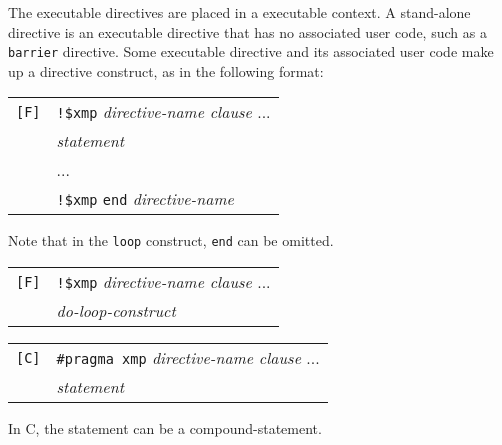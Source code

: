 The executable directives are placed in a executable context. A
stand-alone directive is an executable directive that has no associated
user code, such as a {\tt barrier} directive.
%
Some executable directive and its associated user code make up a
directive construct, as in the following format:

\vspace{0.5cm}

\begin{tabular}{ll}
\verb![F]! & \verb|!$xmp| {\it directive-name clause} ...\\
 & \hspace{0.5cm} {\it statement} \\
 & \hspace{0.5cm} ... \\
 & \verb|!$xmp| {\tt end} {\it directive-name} \\
\end{tabular}
\vspace{0.3cm}

Note that in the {\tt loop} construct, {\tt end} can be omitted.

\vspace{0.5cm}

\begin{tabular}{ll}
\verb![F]! & \verb|!$xmp| {\it directive-name clause} ...\\
 & \hspace{0.5cm} {\it do-loop-construct} \\
\end{tabular}

\vspace{0.5cm}

\begin{tabular}{ll}
\verb![C]! & \verb|#pragma xmp| {\it directive-name clause} ...\\
 & \hspace{0.5cm} {\it statement} \\
\end{tabular}

In C, the statement can be a compound-statement.

